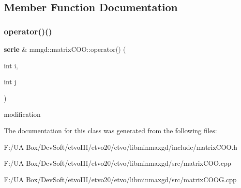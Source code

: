 \subsection{Member Function Documentation}
\mbox{\label{classmmgd_1_1matrix_c_o_o_ade3eba4013547cd0a6956be3a9bb752b}} 
\subsubsection{operator()()}
{\footnotesize\ttfamily \textbf{ serie} \& mmgd\+::matrix\+C\+O\+O\+::operator() (\begin{DoxyParamCaption}\item[{int}]{i,  }\item[{int}]{j }\end{DoxyParamCaption})}

modification 

The documentation for this class was generated from the following files\+:\begin{DoxyCompactItemize}
\item 
F\+:/\+U\+A Box/\+Dev\+Soft/etvo\+I\+I\+I/etvo20/etvo/libminmaxgd/include/matrix\+C\+O\+O.\+h\item 
F\+:/\+U\+A Box/\+Dev\+Soft/etvo\+I\+I\+I/etvo20/etvo/libminmaxgd/src/matrix\+C\+O\+O.\+cpp\item 
F\+:/\+U\+A Box/\+Dev\+Soft/etvo\+I\+I\+I/etvo20/etvo/libminmaxgd/src/matrix\+C\+O\+O\+G.\+cpp\end{DoxyCompactItemize}
